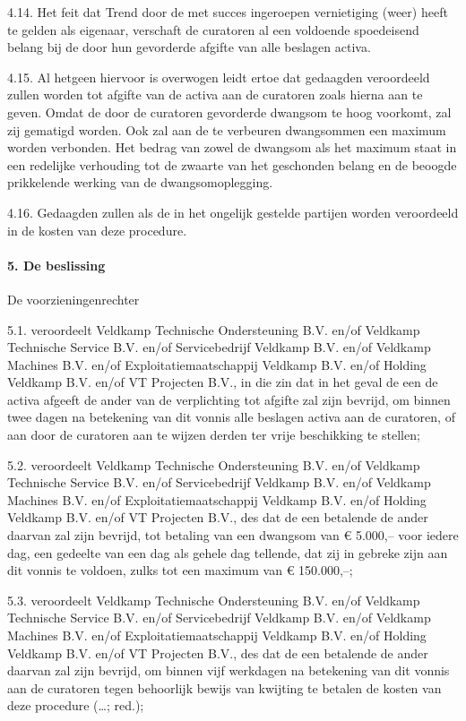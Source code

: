 \documentclass[
  dutch,
  a4paper,
]{article}
\begin{document}
4.14. Het feit dat Trend door de met succes ingeroepen vernietiging (weer) heeft te gelden als eigenaar, verschaft de curatoren al een voldoende spoedeisend belang bij de door hun gevorderde afgifte van alle beslagen activa.

4.15. Al hetgeen hiervoor is overwogen leidt ertoe dat gedaagden veroordeeld zullen worden tot afgifte van de activa aan de curatoren zoals hierna aan te geven. Omdat de door de curatoren gevorderde dwangsom te hoog voorkomt, zal zij gematigd worden. Ook zal aan de te verbeuren dwangsommen een maximum worden verbonden. Het bedrag van zowel de dwangsom als het maximum staat in een redelijke verhouding tot de zwaarte van het geschonden belang en de beoogde prikkelende werking van de dwangsomoplegging.

4.16. Gedaagden zullen als de in het ongelijk gestelde partijen worden veroordeeld in de kosten van deze procedure.

\paragraph{5. De beslissing}\label{de-beslissing-5}

De voorzieningenrechter

5.1. veroordeelt Veldkamp Technische Ondersteuning B.V. en/of Veldkamp Technische Service B.V. en/of Servicebedrijf Veldkamp B.V. en/of Veldkamp Machines B.V. en/of Exploitatiemaatschappij Veldkamp B.V. en/of Holding Veldkamp B.V. en/of VT Projecten B.V., in die zin dat in het geval de een de activa afgeeft de ander van de verplichting tot afgifte zal zijn bevrijd, om binnen twee dagen na betekening van dit vonnis alle beslagen activa aan de curatoren, of aan door de curatoren aan te wijzen derden ter vrije beschikking te stellen;

5.2. veroordeelt Veldkamp Technische Ondersteuning B.V. en/of Veldkamp Technische Service B.V. en/of Servicebedrijf Veldkamp B.V. en/of Veldkamp Machines B.V. en/of Exploitatiemaatschappij Veldkamp B.V. en/of Holding Veldkamp B.V. en/of VT Projecten B.V., des dat de een betalende de ander daarvan zal zijn bevrijd, tot betaling van een dwangsom van € 5.000,-- voor iedere dag, een gedeelte van een dag als gehele dag tellende, dat zij in gebreke zijn aan dit vonnis te voldoen, zulks tot een maximum van € 150.000,--;

5.3. veroordeelt Veldkamp Technische Ondersteuning B.V. en/of Veldkamp Technische Service B.V. en/of Servicebedrijf Veldkamp B.V. en/of Veldkamp Machines B.V. en/of Exploitatiemaatschappij Veldkamp B.V. en/of Holding Veldkamp B.V. en/of VT Projecten B.V., des dat de een betalende de ander daarvan zal zijn bevrijd, om binnen vijf werkdagen na betekening van dit vonnis aan de curatoren tegen behoorlijk bewijs van kwijting te betalen de kosten van deze procedure (\ldots; red.);
\end{document}
